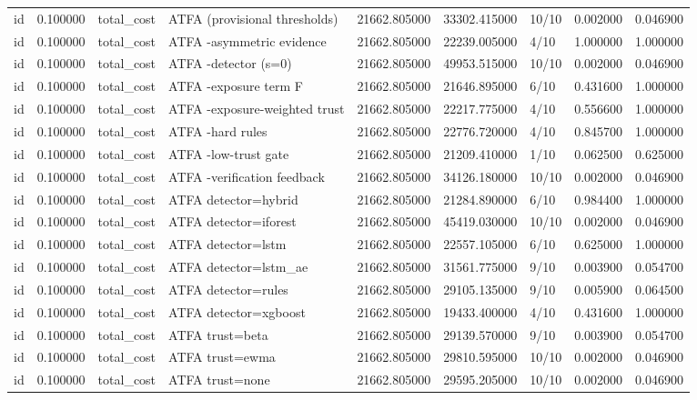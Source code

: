 \begin{tabular}{lrllrrlrr}
id & 0.100000 & total\_cost & ATFA (provisional thresholds) & 21662.805000 & 33302.415000 & 10/10 & 0.002000 & 0.046900 \\
id & 0.100000 & total\_cost & ATFA -asymmetric evidence & 21662.805000 & 22239.005000 & 4/10 & 1.000000 & 1.000000 \\
id & 0.100000 & total\_cost & ATFA -detector (s=0) & 21662.805000 & 49953.515000 & 10/10 & 0.002000 & 0.046900 \\
id & 0.100000 & total\_cost & ATFA -exposure term F & 21662.805000 & 21646.895000 & 6/10 & 0.431600 & 1.000000 \\
id & 0.100000 & total\_cost & ATFA -exposure-weighted trust & 21662.805000 & 22217.775000 & 4/10 & 0.556600 & 1.000000 \\
id & 0.100000 & total\_cost & ATFA -hard rules & 21662.805000 & 22776.720000 & 4/10 & 0.845700 & 1.000000 \\
id & 0.100000 & total\_cost & ATFA -low-trust gate & 21662.805000 & 21209.410000 & 1/10 & 0.062500 & 0.625000 \\
id & 0.100000 & total\_cost & ATFA -verification feedback & 21662.805000 & 34126.180000 & 10/10 & 0.002000 & 0.046900 \\
id & 0.100000 & total\_cost & ATFA detector=hybrid & 21662.805000 & 21284.890000 & 6/10 & 0.984400 & 1.000000 \\
id & 0.100000 & total\_cost & ATFA detector=iforest & 21662.805000 & 45419.030000 & 10/10 & 0.002000 & 0.046900 \\
id & 0.100000 & total\_cost & ATFA detector=lstm & 21662.805000 & 22557.105000 & 6/10 & 0.625000 & 1.000000 \\
id & 0.100000 & total\_cost & ATFA detector=lstm\_ae & 21662.805000 & 31561.775000 & 9/10 & 0.003900 & 0.054700 \\
id & 0.100000 & total\_cost & ATFA detector=rules & 21662.805000 & 29105.135000 & 9/10 & 0.005900 & 0.064500 \\
id & 0.100000 & total\_cost & ATFA detector=xgboost & 21662.805000 & 19433.400000 & 4/10 & 0.431600 & 1.000000 \\
id & 0.100000 & total\_cost & ATFA trust=beta & 21662.805000 & 29139.570000 & 9/10 & 0.003900 & 0.054700 \\
id & 0.100000 & total\_cost & ATFA trust=ewma & 21662.805000 & 29810.595000 & 10/10 & 0.002000 & 0.046900 \\
id & 0.100000 & total\_cost & ATFA trust=none & 21662.805000 & 29595.205000 & 10/10 & 0.002000 & 0.046900 \\

\end{tabular}
